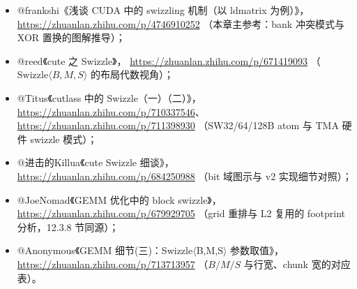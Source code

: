 \begin{itemize}
  \item @frankshi《浅谈 CUDA 中的 swizzling 机制（以 ldmatrix 为例）》，
        \url{https://zhuanlan.zhihu.com/p/4746910252}
        （本章主参考：bank 冲突模式与 XOR 置换的图解推导）；
  \item @reed《cute 之 Swizzle》，
        \url{https://zhuanlan.zhihu.com/p/671419093}
        （$\mathrm{Swizzle}\langle B,M,S\rangle$ 的布局代数视角）；
  \item @Titus《cutlass 中的 Swizzle（一）（二）》，
        \url{https://zhuanlan.zhihu.com/p/710337546}、
        \url{https://zhuanlan.zhihu.com/p/711398930}
        （SW32/64/128B atom 与 TMA 硬件 swizzle 模式）；
  \item @进击的Killua《cute Swizzle 细谈》，
        \url{https://zhuanlan.zhihu.com/p/684250988}
        （bit 域图示与 v2 实现细节对照）；
  \item @JoeNomad《GEMM 优化中的 block swizzle》，
        \url{https://zhuanlan.zhihu.com/p/679929705}
        （grid 重排与 L2 复用的 footprint 分析，12.3.8 节同源）；
  \item @Anonymous《GEMM 细节(三)：Swizzle$\langle$B,M,S$\rangle$ 参数取值》，
        \url{https://zhuanlan.zhihu.com/p/713713957}
        （$B/M/S$ 与行宽、chunk 宽的对应表）。
\end{itemize}
